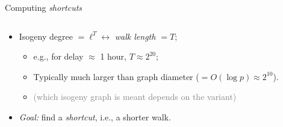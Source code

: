 \documentclass[aspectratio=169]{beamer}
\begin{document}

\begin{frame}{Computing \textit{shortcuts}}
  \begin{columns}
    \begin{column}{0.5\textwidth}
      \begin{itemize}
      \item Isogeny degree $= \ell^T \leftrightarrow$ \emph{walk length $= T$};
        \begin{itemize}
        \item e.g., for delay $\approx$ 1 hour, \emph{$T\approx 2^{20}$};
        \item<2-> Typically much larger than graph diameter (\emph{$= O(\log p) \approx 2^{10}$}).
        \item<2-> \textcolor{gray}{(which isogeny graph is meant depends on the variant)}
        \end{itemize}
      \item<3-> \emph{Goal:} find a \emph{\textit{shortcut}}, i.e., a
        shorter walk.
      \end{itemize}
    \end{column}
    \begin{column}{0.5\textwidth}
      \centering
    \end{column}
  \end{columns}
\end{frame}

\end{document}
